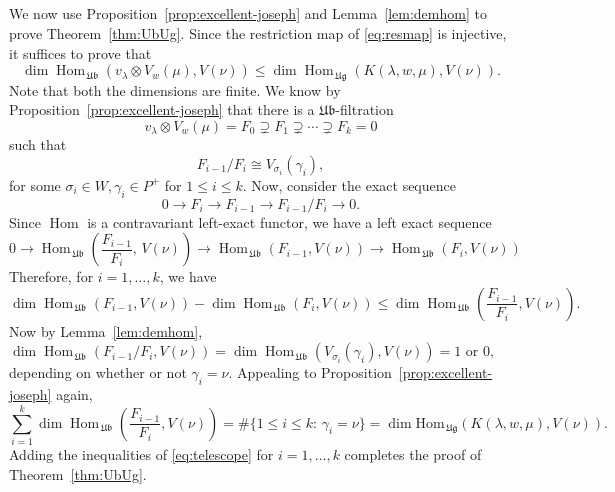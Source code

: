 \documentclass[12pt,reqno]{amsart}
\theoremstyle{plain}
\theoremstyle{definition}
\theoremstyle{remark}
\theoremstyle{plain}
\DeclareMathOperator{\Hom}{Hom}
\begin{document}
\subsection{}
We now use Proposition~\ref{prop:excellent-joseph} and Lemma~\ref{lem:demhom}
 to prove Theorem~\ref{thm:UbUg}. Since the restriction map of \eqref{eq:resmap}
is injective, it suffices to prove that $$\dim \Hom_{\,\mathfrak{Ub}}(v_\lambda\otimes V_w(\mu), V(\nu)) \le \dim \Hom_{\,\mathfrak{Ug}}(K(\lambda, w,\mu), V(\nu)).$$ 
Note that both the dimensions are finite. We know by Proposition~\ref{prop:excellent-joseph} that there is a $\mathfrak{Ub}$-filtration $$v_\lambda\otimes V_w(\mu)=F_0\supsetneq F_1\supsetneq \cdots \supsetneq F_k = 0$$ such that $$F_{i-1}/F_{i}\cong V_{\sigma_i}(\gamma_i),$$ for some $\sigma_i\in W, \gamma_i\in P^+$ for $1 \leq i \leq k$.
%
Now, consider the exact sequence $$0\to F_i\to F_{i-1}\to F_{i-1}/F_i\to 0. $$ Since $\Hom$ is a contravariant left-exact functor, we have a left exact sequence $$0\to \Hom_{\,\mathfrak{Ub}}\left(\frac{F_{i-1}}{F_i},\, V(\nu)\right)\to \Hom_{\,\mathfrak{Ub}}(F_{i-1}, V(\nu)) \to \Hom_{\,\mathfrak{Ub}}(F_{i}, V(\nu))$$ Therefore, for $i=1, \ldots, k$, we have
\begin{equation} \label{eq:telescope}
    \dim \Hom_{\,\mathfrak{Ub}}(F_{i-1}, V(\nu)) - \dim \Hom_{\,\mathfrak{Ub}}(F_i, V(\nu)) \leq \dim \Hom_{\,\mathfrak{Ub}}\left(\frac{F_{i-1}}{F_i}, V(\nu)\right).
\end{equation}
    Now by Lemma~\ref{lem:demhom}, $\dim \Hom_{\,\mathfrak{Ub}}(F_{i-1}/F_i, V(\nu))= \dim \Hom_{\,\mathfrak{Ub}}(V_{\sigma_i}(\gamma_i), V(\nu)) = 1 \text{ or } 0,$ depending on whether or not $\gamma_i = \nu$.
Appealing to Proposition~\ref{prop:excellent-joseph} again, $$\sum_{i=1}^k \dim \Hom_{\,\mathfrak{Ub}}\left(\frac{F_{i-1}}{F_i}, V(\nu)\right) = \#\{1 \leq i \leq k :\, \gamma_i=\nu\} = \dim \text{Hom}_{\,\mathfrak{Ug}}(K(\lambda, w,\mu), V(\nu)).$$
Adding the inequalities of \eqref{eq:telescope} for $i=1, \ldots, k$ completes the proof of Theorem~\ref{thm:UbUg}.
\end{document}
